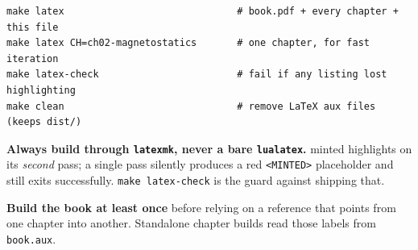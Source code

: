\begin{verbatim}
make latex                              # book.pdf + every chapter + this file
make latex CH=ch02-magnetostatics       # one chapter, for fast iteration
make latex-check                        # fail if any listing lost highlighting
make clean                              # remove LaTeX aux files (keeps dist/)
\end{verbatim}

\begin{gwbox}
\textbf{Always build through \texttt{latexmk}, never a bare \texttt{lualatex}.}
minted highlights on its \emph{second} pass; a single pass silently produces a
red \texttt{<MINTED>} placeholder and still exits successfully.
\verb|make latex-check| is the guard against shipping that.

\smallskip
\textbf{Build the book at least once} before relying on a reference that points
from one chapter into another. Standalone chapter builds read those labels from
\texttt{book.aux}.
\end{gwbox}

\chapterbib
